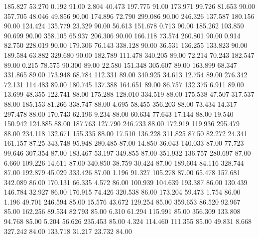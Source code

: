  185.827   53.270    0.192        91.00
   2.804   40.473  197.775        91.00
 173.971   99.726   81.653        90.00
 357.705   48.046   49.856        90.00
 174.896   72.790  299.086        90.00
 246.326  137.587  180.156        90.00
 124.424  135.779   23.329        90.00
  56.613  151.678    0.713        90.00
 185.262  103.850   90.699        90.00
 358.105   65.937  206.306        90.00
 166.118   73.574  260.801        90.00
   0.914   82.750  228.019        90.00
 179.306   76.143  338.128        90.00
  36.531  136.255  133.823        90.00
 189.584   63.882  329.680        90.00
 182.789  111.478  340.205        89.00
  72.214   70.243  182.547        89.00
   0.215   78.575   90.300        89.00
  22.580  151.348  305.607        89.00
 163.899   68.347  331.865        89.00
 173.948   68.784  112.331        89.00
 340.925   34.613   12.754        89.00
 276.342   72.131  114.483        89.00
 180.745  137.388  164.651        89.00
  86.757  132.375    6.911        89.00
  13.699   48.355  122.741        88.00
 175.288  128.010  334.519        88.00
 175.538   47.507  317.537        88.00
 185.153   81.266  338.747        88.00
   4.695   58.455  356.203        88.00
  73.434   14.317  297.478        88.00
 170.743   62.196    9.234        88.00
  60.634   77.643   17.144        88.00
  19.540  150.942  124.885        88.00
 187.763  127.790  246.733        88.00
 172.919  119.936  295.479        88.00
 234.118  132.671  155.335        88.00
  17.510  136.228  311.825        87.50
  82.272   24.341  161.157        87.25
 343.748   95.948  280.485        87.00
  14.850   36.043  140.033        87.00
  77.723   99.646  307.354        87.00
 183.467   53.197  349.855        87.00
 351.932  136.757  280.697        87.00
   6.660  109.226   14.611        87.00
 340.850   38.759   30.424        87.00
 189.604   84.116  328.744        87.00
 192.879   45.029  333.426        87.00
   1.196   91.327  105.278        87.00
  65.478  157.681  342.089        86.00
 170.131   66.335    4.572        86.00
 100.939  104.639  193.387        86.00
 130.439  146.784   32.927        86.00
 176.915   74.426  320.538        86.00
 173.204   59.473    1.754        86.00
   1.196   49.701  246.594        85.00
  15.576   43.672  129.254        85.00
 359.653   86.520   92.967        85.00
 162.256   89.534   82.793        85.00
   6.310   61.294  115.991        85.00
 356.309  133.808   94.768        85.00
   5.204   56.626  235.453        85.00
   4.324  114.460  111.355        85.00
  49.831    8.668  327.242        84.00
 133.718   31.217   23.732        84.00
